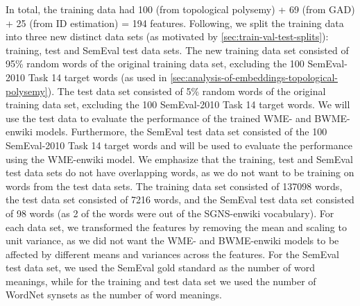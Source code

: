 In total, the training data had 100 (from topological polysemy) + 69 (from GAD) + 25 (from ID estimation) = 194 features. Following, we split the training data into three new distinct data sets (as motivated by \cref{sec:train-val-test-splits}): training, test and SemEval test data sets. The new training data set consisted of 95\% random words of the original training data set, excluding the 100 SemEval-2010 Task 14 target words (as used in \cref{sec:analysis-of-embeddings-topological-polysemy}). The test data set consisted of 5\% random words of the original training data set, excluding the 100 SemEval-2010 Task 14 target words. We will use the test data to evaluate the performance of the trained WME- and BWME-enwiki models. Furthermore, the SemEval test data set consisted of the 100 SemEval-2010 Task 14 target words and will be used to evaluate the performance using the WME-enwiki model. We emphasize that the training, test and SemEval test data sets do not have overlapping words, as we do not want to be training on words from the test data sets. The training data set consisted of 137098 words, the test data set consisted of 7216 words, and the SemEval test data set consisted of 98 words (as 2 of the words were out of the SGNS-enwiki vocabulary). For each data set, we transformed the features by removing the mean and scaling to unit variance, as we did not want the WME- and BWME-enwiki models to be affected by different means and variances across the features. For the SemEval test data set, we used the SemEval gold standard as the number of word meanings, while for the training and test data set we used the number of WordNet synsets as the number of word meanings.

